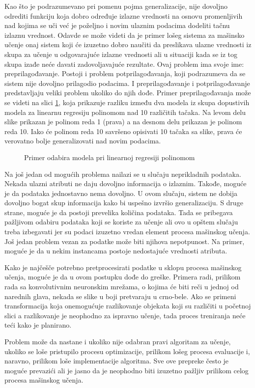 Kao što je podrazumevano pri pomenu pojma generalizacije, nije dovoljno odrediti funkciju koja dobro određuje izlazne vrednosti na osnovu promenljivih nad kojima se uči već je poželjno i novim ulaznim podacima dodeliti tačnu izlaznu vrednost. Odavde se može videti da je primer lošeg sistema za mašinsko učenje onaj sistem koji će izuzetno dobro naučiti da preslikava ulazne vrednosti iz skupa za učenje u odgovarajuće izlazne vrednosti ali u situaciji kada se iz tog skupa izađe neće davati zadovoljavajuće rezultate. Ovaj problem ima svoje ime: preprilagođavanje. Postoji i problem potprilagođavanja, koji podrazumeva da se sistem nije dovoljno prilagodio podacima. I preprilagođavanje i potprilagođavanje predstavljaju veliki problem ukoliko do njih dođe. Primer preprilagođavanja može se videti na slici \ref{fig:odabir}, koja prikazuje razliku između dva modela iz skupa dopustivih modela za linearnu regresiju polinomom nad 10 različitih tačaka. Na levom delu slike prikazan je polinom reda 1 (prava) a na desnom delu prikazan je polinom reda 10. Iako će polinom reda 10 savršeno opisivati 10 tačaka sa slike, prava će verovatno bolje generalizovati nad novim podacima.
\begin{figure}
	\centering
	\resizebox{.45\linewidth}{!}{}
	\resizebox{.45\linewidth}{!}{}
	\caption{Primer odabira modela pri linearnoj regresiji polinomom}
	\label{fig:odabir}
\end{figure}

\par
Na još jedan od mogućih problema nailazi se u slučaju neprikladnih podataka. Nekada ulazni atributi ne daju dovoljno informacija o izlaznim. Takođe, moguće je da podataka jednostavno nema dovoljno. U ovom slučaju, sistem ne dobija dovoljno bogat skup informacija kako bi uspešno izvršio generalizaciju. S druge strane, moguće je da postoji prevelika količina podataka. Tada se pribegava pažljivom odabiru podataka koji se koriste za učenje ali ovo u opštem slučaju  treba izbegavati jer su podaci izuzetno vredan element procesa mašinskog učenja. Još jedan problem vezan za podatke može biti njihova nepotpunost. Na primer, moguće je da u nekim instancama postoje nedostajuće vrednosti atributa. \par
Kako je najčešče potrebno pretprocesirati podatke u sklopu procesa mašinskog učenja, moguće je da u ovom postupku dođe do greške. Primera radi, prilikom rada sa konvolutivnim neuronskim mrežama, o kojima će biti reči u jednoj od narednih glava, nekada se slike  u boji pretvaraju u crno-bele. Ako se primeni transformacija koja onemogućuje razlikovanje objekata koji su različiti u početnoj slici a razlikovanje je neophodno za ispravno učenje, tada proces treniranja neće teći kako je planirano. \par


Problem može da nastane i ukoliko nije odabran pravi algoritam za učenje, ukoliko se loše pristupilo procesu optimizacije, prilikom lošeg procesa evaluacije i, naravno, prilikom loše implementacije algoritma. Sve ove prepreke često je moguće prevazići ali je jasno da je neophodno biti izuzetno pažljiv prilikom celog procesa mašinskog učenja.